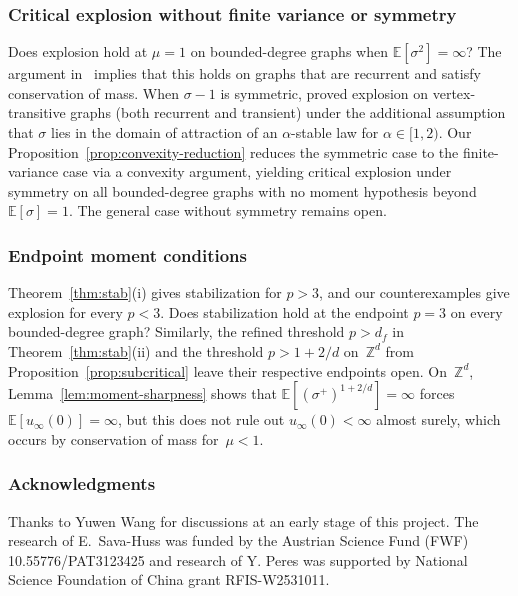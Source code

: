 \documentclass[11pt]{amsart}
\theoremstyle{plain}
\theoremstyle{definition}
\newcommand{\Z}{\mathbb{Z}}
\newcommand{\E}{\mathbb{E}}
\begin{document}
	\subsubsection*{Critical explosion without finite variance or symmetry}
	
	Does explosion hold at $\mu=1$ on bounded-degree graphs when $\E[\sigma^2]=\infty$? 
	The argument in~\citet{div-sand-crit} implies that this holds on graphs that are recurrent and satisfy conservation of mass. When $\sigma-1$ is symmetric, \citet*{MR3834853} proved explosion on vertex-transitive graphs (both recurrent and transient) under the additional assumption that $\sigma$ lies in the domain of attraction of an $\alpha$-stable law for $\alpha\in[1,2)$. Our Proposition~\ref{prop:convexity-reduction} reduces the symmetric case to the finite-variance case via a convexity argument, yielding critical explosion under symmetry on all bounded-degree graphs with no moment hypothesis beyond~$\E[\sigma]=1$. The general case without symmetry remains open.
	
	\subsubsection*{Endpoint moment conditions}
	
	Theorem~\ref{thm:stab}(i) gives stabilization for $p>3$, and our counterexamples give explosion for every $p<3$. Does stabilization hold at the endpoint $p=3$ on every bounded-degree graph? Similarly, the refined threshold $p>d_f$ in Theorem~\ref{thm:stab}(ii) and the threshold $p>1+2/d$ on~$\Z^d$ from Proposition~\ref{prop:subcritical} leave their respective endpoints open. On~$\Z^d$, Lemma~\ref{lem:moment-sharpness} shows that $\E[(\sigma^+)^{1+2/d}]=\infty$ forces $\E[u_\infty(0)]=\infty$, but this does not rule out $u_\infty(0)<\infty$ almost surely, which occurs by conservation of mass for~$\mu < 1$. 
	
	\subsubsection*{Acknowledgments}
	Thanks to Yuwen Wang for discussions at an early stage of this project.
	The research of E.\ Sava-Huss was funded by the Austrian Science Fund (FWF) 10.55776/\allowbreak{}PAT3123425 and research of Y. Peres was supported by National Science Foundation of China grant RFIS-W2531011.

	
	
	
	
	
	
	
\end{document}

